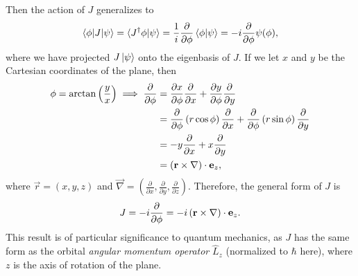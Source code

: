 
Then the action of $J$ generalizes to
\begin{align*}
    \braket{\phi|J|\psi} = \braket{J^\dagger \phi|\psi} = \frac{1}{i}\frac{\partial}{\partial\phi}\braket{\phi|\psi} = -i\frac{\partial}{\partial\phi}\psi(\phi),
\end{align*}
where we have projected $J\ket{\psi}$ onto the eigenbasis of $J$. If we let $x$ and $y$ be the Cartesian coordinates of the plane, then
\begin{align*}
    \phi = \arctan\left(\frac{y}{x}\right) \implies \frac{\partial}{\partial\phi} 
        &= \frac{\partial x}{\partial \phi}\frac{\partial}{\partial x} + \frac{\partial y}{\partial \phi}\frac{\partial}{\partial y} \\
        &= \frac{\partial}{\partial\phi}\left( r\cos\phi \right)\frac{\partial}{\partial x} + \frac{\partial}{\partial\phi}\left( r\sin\phi \right)\frac{\partial}{\partial y} \\
        &= -y\frac{\partial}{\partial x} + x\frac{\partial}{\partial y} \\
        &= (\mathbf{r}\times\mathbf{\nabla})\cdot\mathbf{e}_z,
\end{align*}
where $\vec{r} = (x,y,z)$ and $\vec{\nabla} = \left(\frac{\partial}{\partial x},\frac{\partial}{\partial y},\frac{\partial}{\partial z}\right)$. Therefore, the general form of $J$ is
\begin{align}\label{eq:SO2_J}
    J = -i \frac{\partial}{\partial\phi} = -i \left( \mathbf{r}\times\mathbf{\nabla} \right)\cdot\mathbf{e}_z.
\end{align}
This result is of particular significance to quantum mechanics, as $J$ has the same form as the orbital \textit{angular momentum operator} $\hat{L}_z$ (normalized to $\hbar$ here), where $z$ is the axis of rotation of the plane\cite{Hall2013,Griffiths2018}.


